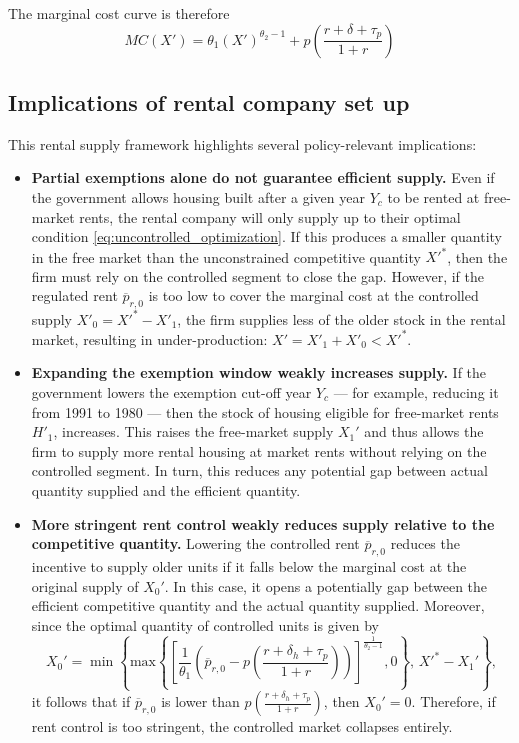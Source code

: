 \documentclass[parskip=full]{article}
\begin{document}
\noindent The marginal cost curve is therefore \[MC(X')=\theta_1(X')^{\theta_2-1}+p\left(\frac{r+\delta+\tau_p}{1+r}\right)\]

\subsection{Implications of rental company set up}

This rental supply framework highlights several policy-relevant implications:

\begin{itemize}

\item \textbf{Partial exemptions alone do not guarantee efficient supply.} 
Even if the government allows housing built after a given year $Y_{c}$ to be rented at free-market rents, the rental company will only supply up to their optimal condition \eqref{eq:uncontrolled_optimization}. If this produces a smaller quantity in the free market than the unconstrained competitive quantity $X'^*$, then the firm must rely on the controlled segment to close the gap. However, if the regulated rent $\overline{p}_{r,0}$ is too low to cover the marginal cost at the controlled supply $X'_0=X'^*-X'_1$, the firm supplies less of the older stock in the rental market, resulting in under-production: $X'=X'_1+X'_0<X'^*$.

\item \textbf{Expanding the exemption window weakly increases supply.} 
If the government lowers the exemption cut-off year $Y_{c}$ — for example, reducing it from 1991 to 1980 — then the stock of housing eligible for free-market rents $H'_1$, increases. This raises the free-market supply $X_1'$ and thus allows the firm to supply more rental housing at market rents without relying on the controlled segment. In turn, this reduces any potential gap between actual quantity supplied and the efficient quantity.

\item \textbf{More stringent rent control weakly reduces supply relative to the competitive quantity.} 
Lowering the controlled rent $\overline{p}_{r,0}$ reduces the incentive to supply older units if it falls below the marginal cost at the original supply of $X_0'$. In this case, it opens a potentially gap between the efficient competitive quantity and the actual quantity supplied. Moreover, since the optimal quantity of controlled units is given by \[X_0'=\min\left\{\text{max}\left\{\left[\frac{1}{\theta_{1}}\left(\overline{p}_{r,0}-p\left(\frac{r+\delta_{h}+\tau_{p}}{1+r}\right)\right)\right]^{\frac{1}{\theta_{2}-1}},0\right\},\, X'^*-X_1'\right\},\]
it follows that if $\overline{p}_{r,0}$ is lower than  
$p\left(\frac{r+\delta_{h}+\tau_{p}}{1+r} \right)$, then $X_0'=0$. Therefore, if rent control is too stringent, the controlled market collapses entirely.

\end{itemize}
\end{document}
